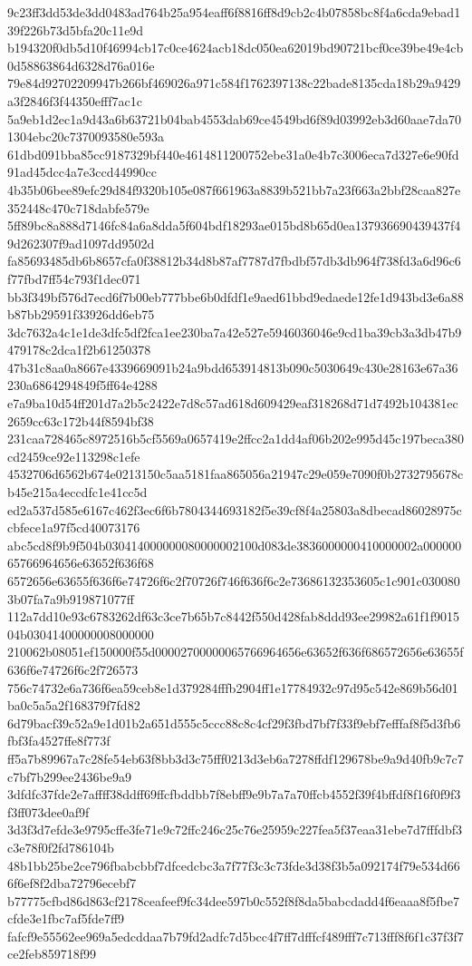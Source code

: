 {9c23ff3dd53de3dd0483ad764b25a954eaff6f8816ff8d9cb2c4b07858bc8f4a6cda9ebad139f226b73d5bfa20c11e9d
b194320f0db5d10f46994cb17c0ce4624acb18dc050ea62019bd90721bcf0ce39be49e4cb0d58863864d6328d76a016e
79e84d92702209947b266bf469026a971c584f1762397138c22bade8135cda18b29a9429a3f2846f3f44350efff7ac1c
5a9eb1d2ec1a9d43a6b63721b04bab4553dab69ce4549bd6f89d03992eb3d60aae7da701304ebc20c7370093580e593a
61dbd091bba85cc9187329bf440e4614811200752ebe31a0e4b7c3006eca7d327e6e90fd91ad45dcc4a7e3ccd44990cc
4b35b06bee89efc29d84f9320b105e087f661963a8839b521bb7a23f663a2bbf28caa827e352448c470c718dabfe579e
5ff89bc8a888d7146fc84a6a8dda5f604bdf18293ae015bd8b65d0ea137936690439437f49d262307f9ad1097dd9502d
fa85693485db6b8657cfa0f38812b34d8b87af7787d7fbdbf57db3db964f738fd3a6d96c6f77fbd7ff54c793f1dec071
bb3f349bf576d7ecd6f7b00eb777bbe6b0dfdf1e9aed61bbd9edaede12fe1d943bd3e6a88b87bb29591f33926dd6eb75
3dc7632a4c1e1de3dfc5df2fca1ee230ba7a42e527e5946036046e9cd1ba39cb3a3db47b9479178c2dca1f2b61250378
47b31c8aa0a8667e4339669091b24a9bdd653914813b090c5030649c430e28163e67a36230a6864294849f5ff64e4288
e7a9ba10d54ff201d7a2b5c2422e7d8c57ad618d609429eaf318268d71d7492b104381ec2659cc63c172b44f8594bf38
231caa728465c8972516b5cf5569a0657419e2ffcc2a1dd4af06b202e995d45c197beca380cd2459ce92e113298c1efe
4532706d6562b674e0213150c5aa5181faa865056a21947c29e059e7090f0b2732795678cb45e215a4eccdfc1e41cc5d
ed2a537d585e6167c462f3ec6f6b7804344693182f5e39cf8f4a25803a8dbecad86028975ccbfece1a97f5cd40073176
abc5cd8f9b9f504b030414000000080000002100d083de3836000000410000002a00000065766964656e63652f636f68
6572656e63655f636f6e74726f6c2f70726f746f636f6c2e73686132353605c1c901c0300803b07fa7a9b919871077ff
112a7dd10e93c6783262df63c3ce7b65b7c8442f550d428fab8ddd93ee29982a61f1f901504b03041400000008000000
210062b08051ef150000f55d00002700000065766964656e63652f636f686572656e63655f636f6e74726f6c2f726573
756c74732e6a736f6ea59ceb8e1d379284fffb2904ff1e17784932c97d95c542e869b56d01ba0c5a5a2f168379f7fd82
6d79bacf39c52a9e1d01b2a651d555c5ccc88c8c4cf29f3fbd7bf7f33f9ebf7efffaf8f5d3fb6fbf3fa4527ffe8f773f
ff5a7b89967a7c28fe54eb63f8bb3d3c75fff0213d3eb6a7278ffdf129678be9a9d40fb9c7c7c7bf7b299ee2436be9a9
3dfdfc37fde2e7affff38ddff69ffcfbddbb7f8ebff9e9b7a7a70ffcb4552f39f4bffdf8f16f0f9f3f3ff073dee0af9f
3d3f3d7efde3e9795cffe3fe71e9c72ffc246c25c76e25959c227fea5f37eaa31ebe7d7fffdbf3c3e78f0f2fd786104b
48b1bb25be2ce796fbabcbbf7dfcedcbc3a7f77f3c3c73fde3d38f3b5a092174f79e534d666f6ef8f2dba72796ecebf7
b77775cfbd86d863cf2178ceafeef9fc34dee597b0c552f8f8da5babcdadd4f6eaaa8f5fbe7cfde3e1fbc7af5fde7ff9
fafcf9e55562ee969a5edcddaa7b79fd2adfc7d5bcc4f7ff7dfffcf489fff7c713fff8f6f1c37f3f7ce2feb859718f99
}
